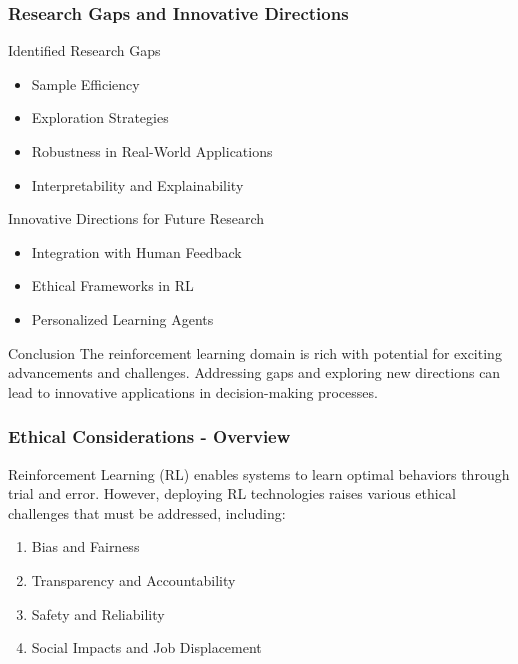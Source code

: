 \documentclass[aspectratio=169]{beamer}
\begin{document}
\begin{frame}[fragile]
    \frametitle{Research Gaps and Innovative Directions}
    \begin{block}{Identified Research Gaps}
        \begin{itemize}
            \item Sample Efficiency
            \item Exploration Strategies
            \item Robustness in Real-World Applications
            \item Interpretability and Explainability
        \end{itemize}
    \end{block}
    \begin{block}{Innovative Directions for Future Research}
        \begin{itemize}
            \item Integration with Human Feedback
            \item Ethical Frameworks in RL
            \item Personalized Learning Agents
        \end{itemize}
    \end{block}
    \begin{block}{Conclusion}
        The reinforcement learning domain is rich with potential for exciting advancements and challenges. Addressing gaps and exploring new directions can lead to innovative applications in decision-making processes.
    \end{block}
\end{frame}

\begin{frame}[fragile]
    \frametitle{Ethical Considerations - Overview}
    Reinforcement Learning (RL) enables systems to learn optimal behaviors through trial and error. 
    However, deploying RL technologies raises various ethical challenges that must be addressed, including:
    
    \begin{enumerate}
        \item Bias and Fairness
        \item Transparency and Accountability
        \item Safety and Reliability
        \item Social Impacts and Job Displacement
    \end{enumerate}
\end{frame}
\end{document}

